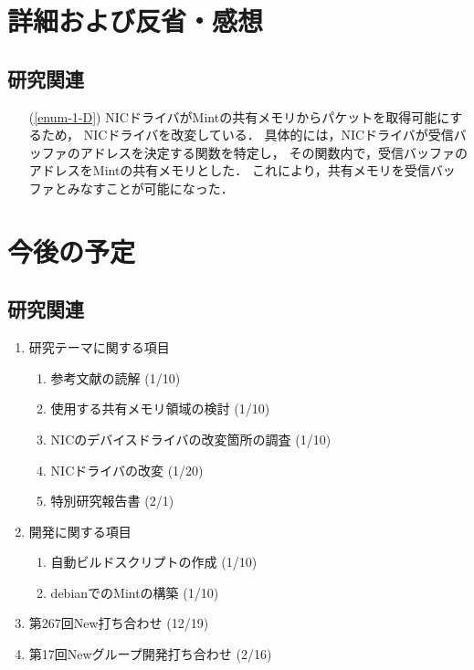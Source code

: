 \documentclass[fleqn, 14pt]{extarticle}
\begin{document}
\section{詳細および反省・感想}
\label{sec-3}
\subsection{研究関連}
\label{sec-3-1}

\begin{itemize}
\item[(\ref{enum-1-D})]
    NICドライバがMintの共有メモリからパケットを取得可能にするため，
    NICドライバを改変している．
    具体的には，NICドライバが受信バッファのアドレスを決定する関数を特定し，
    その関数内で，受信バッファのアドレスをMintの共有メモリとした．
    これにより，共有メモリを受信バッファとみなすことが可能になった．
\end{itemize}


\section{今後の予定}
\label{sec-4}
\subsection{研究関連}
\label{sec-4-1}

\begin{enumerate}
\item 研究テーマに関する項目
\hfill
\begin{enumerate}


\item 参考文献の読解
\hfill
(1/10)

\item 使用する共有メモリ領域の検討
\hfill
(1/10)

\item NICのデバイスドライバの改変箇所の調査
\hfill
(1/10)

\item NICドライバの改変
\hfill
(1/20)

\item 特別研究報告書 
\hfill
(2/1)


\end{enumerate}
\item 開発に関する項目
\hfill
\begin{enumerate}

\item 自動ビルドスクリプトの作成
\hfill
(1/10)

\item debianでのMintの構築
\hfill
(1/10)

\end{enumerate}
\item 第267回New打ち合わせ
\hfill
\label{enum-7}
(12/19)
\item 第17回Newグループ開発打ち合わせ
\hfill
\label{enum-8}
(2/16)
\end{enumerate}
\end{document}
